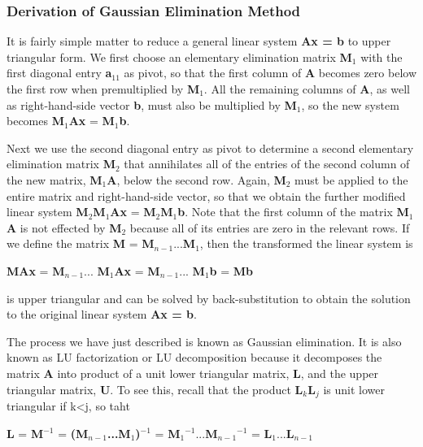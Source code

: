 \documentclass[12pt]{article}
\begin{document}
\subsubsection*{Derivation of Gaussian Elimination Method}{

It is fairly simple matter to reduce a general linear system \textbf{Ax = b} to
upper triangular form. We first choose an elementary elimination matrix
\textbf{M$_1$} with the first diagonal entry \textbf{a$_{11}$} as pivot, so that
the first column of \textbf{A} becomes zero below the first row when
premultiplied by \textbf{M$_1$}. All the remaining columns of \textbf{A}, as
well as right-hand-side vector \textbf{b}, must also be multiplied by
\textbf{M$_1$}, so the new system becomes \textbf{M$_1$}\textbf{Ax} =
\textbf{M$_1$}\textbf{b}.

Next we use the second diagonal entry as pivot to determine a second elementary
elimination matrix \textbf{M$_2$} that annihilates all of the entries of the
second column of the new matrix, \textbf{M$_1$}\textbf{A}, below the second row.
Again, \textbf{M$_2$} must be applied to the entire matrix and right-hand-side
vector, so that we obtain the further modified linear system
\textbf{M$_2$}\textbf{M$_1$}\textbf{Ax} =
\textbf{M$_2$}\textbf{M$_1$}\textbf{b}. Note that the first column of the matrix
\textbf{M$_1$}\textbf{A} is not effected by \textbf{M$_2$} because all of its
entries are zero in the relevant rows. If we define the matrix \textbf{M} =
\textbf{M$_{n-1}$}...\textbf{M$_{1}$}, then the transformed the linear system is

\textbf{M}\textbf{A}\textbf{x} = \textbf{M$_{n-1}$}...
\textbf{M$_{1}$}\textbf{A}\textbf{x} = \textbf{M$_{n-1}$}...
\textbf{M$_{1}$}\textbf{b} = \textbf{M}\textbf{b}

is upper triangular and can be solved by back-substitution to obtain the
solution to the original linear system \textbf{Ax = b}.

The process we have just described is known as Gaussian elimination. It is also
known as LU factorization or LU decomposition because it decomposes the matrix
\textbf{A} into product of a unit lower triangular matrix, \textbf{L}, and the
upper triangular matrix, \textbf{U}. To see this, recall that the product
\textbf{L$_k$}\textbf{L$_j$} is unit lower triangular if k<j, so taht

\textbf{L} = \textbf{M$^{-1}$} =
\textbf{(\textbf{M$_{n-1}$}...\textbf{M$_{1}$})$^{-1}$} =
\textbf{{M$_{1}$}$^{-1}$}...\textbf{{M$_{n-1}$}$^{-1}$} =
\textbf{L$_{1}$}...\textbf{L$_{n-1}$}

}
\end{document}
